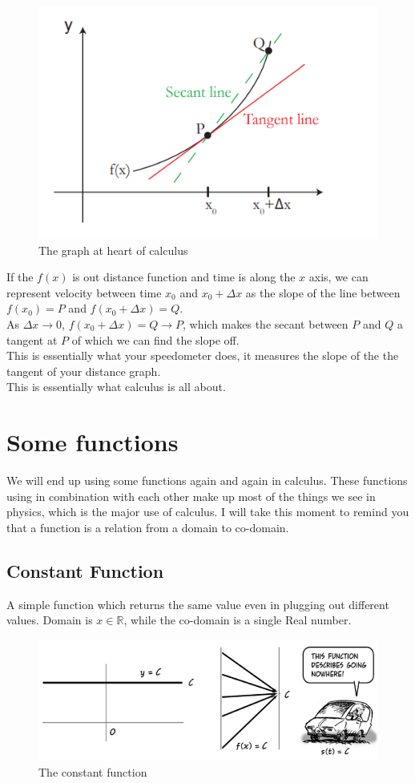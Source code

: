 \begin{figure} [h]
    \centering
    \includegraphics[width=0.5\linewidth]{Photos/Calculus tangent.png}
    \caption{The graph at heart of calculus}
    
\end{figure}
If the $f(x)$ is out distance function and time is along the $x$ axis, we can represent velocity between time $x_0$ and $x_0+\Delta x$ as the slope of the line between $f(x_0)=P$ and $f(x_0+\Delta x)=Q$.\\
As $\Delta x \rightarrow 0$, $f(x_0+\Delta x)=Q \rightarrow P$, which makes the secant between $P$ and $Q$ a tangent at $P$ of which we can find the slope off.\\
This is essentially what your speedometer does, it measures the slope of the the tangent of your distance graph.\\
This is essentially what calculus is all about.\\
\section{Some functions}
We will end up using some functions again and again in calculus. These functions using in combination with each other make up most of the things we see in physics, which is the major use of calculus. I will take this moment to remind you that a function is a relation from a domain to co-domain.\\
\subsection{Constant Function}
A simple function which returns the same value even in plugging out different values. Domain is  $x \in \mathbb{R}$, while the co-domain is a single Real number. \\
\begin{figure} [h]
    \centering
    \includegraphics[width=0.5\linewidth]{Photos/Constant function.png}
    \caption{The constant function}
    
\end{figure}
